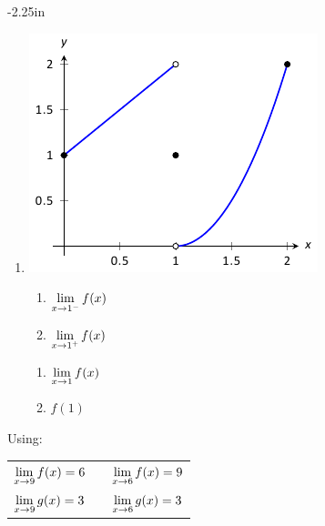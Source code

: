 \begin{adjustwidth*}{}{-2.25in}
\begin{multicols*}{2}
\begin{enumerate}[1),resume]
\item
\begin{minipage}{\linewidth}\centering
\includegraphics[scale=.8]{figures/fig01_04_ex_08}
\end{minipage}

\noindent\begin{minipage}[t]{.5\linewidth}
\begin{enumerate}
\item		$\displaystyle \lim_{x\to 1^-} f(x)$
\item		$\displaystyle \lim_{x\to 1^+} f(x)$
\end{enumerate}
\end{minipage}
\noindent\begin{minipage}[t]{.5\linewidth}
\begin{enumerate}\addtocounter{enumii}{2}
\item		$\displaystyle \lim_{x\to 1} f(x)$
\item		$f(1)$
\end{enumerate}
\end{minipage}

\end{enumerate}

\vspace{.5cm}

\noindent Using:

\begin{tabular}{lll}
$\displaystyle \lim_{x \to 9}f(x) = 6$ & \quad\quad &$\displaystyle \lim_{x \to 6} f(x) = 9$\\
$\displaystyle \lim_{x \to 9}g(x) = 3$ &  & $\displaystyle \lim_{x \to 6} g(x) = 3$
\end{tabular}


\end{multicols*}
\end{adjustwidth*}
